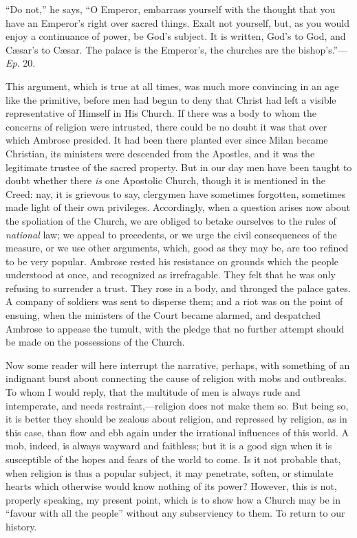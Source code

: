 ``Do not,'' he says, ``O Emperor, embarrass yourself
with the thought that you have an Emperor's right over sacred things.
Exalt not yourself, but, as you would enjoy a continuance of power, be
God's subject. It is written, God's to God, and Cæsar's to Cæsar.
The palace is the Emperor's, the churches are the bishop's.''—\emph{Ep}.
20.

This argument, which is true at all times, was much more convincing
in an age like the primitive, before men had begun to deny that Christ
had left a visible representative of Himself in His Church. If there
was a body to whom the concerns of religion were intrusted, there
could be no doubt it was that over which Ambrose presided. It had been
there planted ever since Milan became Christian, its ministers were
descended from the Apostles, and it was the legitimate trustee of the
sacred property. But in our day men have been taught to doubt
whether there \emph{is} one Apostolic Church, though it is mentioned
in the Creed: nay, it is grievous to say, clergymen have sometimes
forgotten, sometimes made light of their own privileges. Accordingly,
when a question arises now about the spoliation of the Church, we are
obliged to betake ourselves to the rules of \emph{national} law; we
appeal to precedents, or we urge the civil consequences of the
measure, or we use other arguments, which, good as they may be, are
too refined to be very popular. Ambrose rested his resistance on
grounds which the people understood at once, and recognized as
irrefragable. They felt that he was only refusing to surrender a
trust. They rose in a body, and thronged the palace gates. A company
of soldiers was sent to disperse them; and a riot was on the point of
ensuing, when the ministers of the Court became alarmed, and
despatched Ambrose to appease the tumult, with the pledge that no
further attempt should be made on the possessions of the Church.

Now some reader will here interrupt the narrative, perhaps, with
something of an indignant burst about connecting the cause of religion
with mobs and outbreaks. To whom I would reply, that the multitude of
men is always rude and intemperate, and needs restraint,—religion
does not make them so. But being so, it is better they should be
zealous about religion, and repressed by religion, as in this case,
than flow and ebb again under the irrational influences of this world.
A mob, indeed, is always wayward and faithless; but it is a good sign
when it is susceptible of the hopes and fears of the world to come. Is
it not probable that, when religion is thus a popular subject, it may
penetrate, soften, or stimulate hearts which otherwise would know
nothing of its power? However, this is not, properly speaking,
my present point, which is to show how a Church may be in ``favour
with all the people'' without any subserviency to them. To return
to our history.

